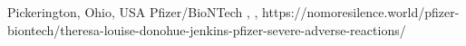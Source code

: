           {Pickerington, Ohio, USA}
          {}
          {Pfizer/BioNTech}
          {}
          {
            ,
            ,
          }
          {https://nomoresilence.world/pfizer-biontech/theresa-louise-donohue-jenkins-pfizer-severe-adverse-reactions/}
